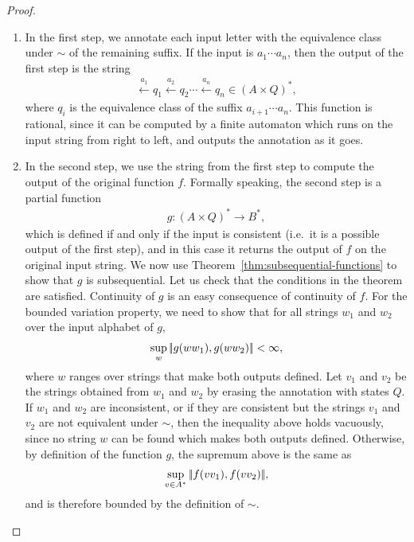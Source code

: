 \begin{proof}
\begin{enumerate}
    \item In the first step, we annotate each input letter with the equivalence class under $\sim$ of the remaining suffix. If the input is $a_1 \cdots a_n$, then the output of the first step is the string
\begin{align*}
\xleftarrow{a_1} q_1 \xleftarrow{a_2} q_2 \cdots \xleftarrow{a_n} q_n \in (A \times Q)^*,
\end{align*}
where $q_i$ is the equivalence class of the suffix $a_{i+1} \cdots a_n$. This function is rational, since it can be computed by a finite automaton which runs on the input string from right to left, and outputs the annotation as it goes.
    \item In the second step, we use the string from the first step to compute the output of the original function $f$. Formally speaking, the second step is a partial function 
    \begin{align*}
     g : (A \times Q)^* \to B^*,
    \end{align*}
    which is defined if and only if the input is consistent (i.e.~it is a possible output of the first step), and in this case it returns the output of $f$ on the original input string. We now use Theorem~\ref{thm:subsequential-functions} to show that $g$ is subsequential. Let us check that the conditions in the theorem are satisfied. Continuity of $g$ is an easy consequence of continuity of $f$. For the bounded variation property,  we need to show that  for all strings $w_1$ and $w_2$ over the input alphabet of $g$,
    \begin{align*}
    \sup_{w} |\!| g(ww_1), g(ww_2) |\!| < \infty,
    \end{align*}
    where $w$ ranges over strings that make both outputs defined.
    Let $v_1$ and $v_2$ be the strings obtained from $w_1$ and $w_2$ by erasing the annotation with states $Q$. If $w_1$ and $w_2$ are inconsistent, or if they are consistent but the strings $v_1$ and $v_2$ are not equivalent under $\sim$, then the inequality above holds vacuously, since no string $w$ can be found which makes both outputs defined. Otherwise, by definition of the function $g$, the supremum above is the same as 
    \begin{align*}
    \sup_{v \in A^*} |\!| f(vv_1), f(vv_2) |\!|,
    \end{align*}
    and is therefore bounded by the definition of $\sim$.
\end{enumerate}

\end{proof}


